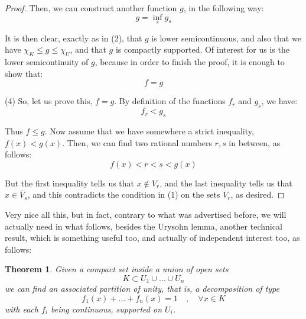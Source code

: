 \documentclass[12pt]{amsbook}
\newtheorem{theorem}{Theorem}[chapter]
\begin{document}
\begin{proof}
Then, we can construct another function $g$, in the following way:
$$g=\inf_sg_s$$

It is then clear, exactly as in (2), that $g$ is lower semicontinuous, and also that we have $\chi_K\leq g\leq\chi_U$, and that $g$ is compactly supported. Of interest for us is the lower semicontinuity of $g$, because in order to finish the proof, it is enough to show that:
$$f=g$$

(4) So, let us prove this, $f=g$. By definition of the functions $f_r$ and $g_s$, we have:
$$f_r<g_s$$

Thus $f\leq g$. Now assume that we have somewhere a strict inequality, $f(x)<g(x)$. Then, we can find two rational numbers $r,s$ in between, as follows:
$$f(x)<r<s<g(x)$$

But the first inequality tells us that $x\notin V_r$, and the last inequality tells us that $x\in\bar{V}_s$, and this contradicts the condition in (1) on the sets $V_r$, as desired.
\end{proof}

Very nice all this, but in fact, contrary to what was advertised before, we will actually need in what follows, besides the Urysohn lemma, another technical result, which is something useful too, and actually of independent interest too, as follows:

\begin{theorem}
Given a compact set inside a union of open sets
$$K\subset U_1\cup\ldots\cup U_n$$
we can find an associated partition of unity, that is, a decomposition of type
$$f_1(x)+\ldots+f_n(x)=1\quad,\quad\forall x\in K$$
with each $f_i$ being continuous, supported on $U_i$.
\end{theorem}
\end{document}

